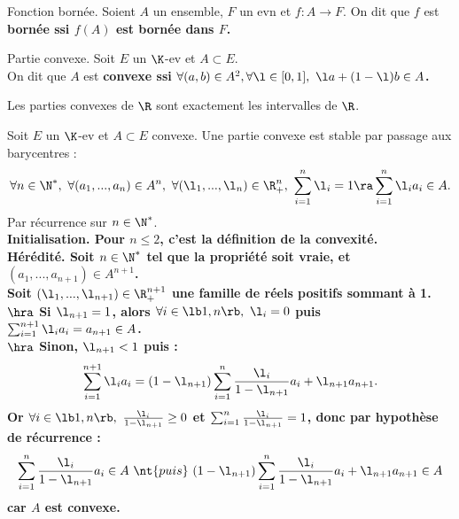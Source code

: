 \documentclass[11pt]{article}
\begin{document}
\vspace*{-0.8cm}

\begin{defi}{Fonction bornée.}{}
    Soient $A$ un ensemble, $F$ un evn et $f:A\to F$. On dit que $f$ est \bf{bornée} ssi $f(A)$ est bornée dans $F$.
\end{defi}

\vspace*{-0.8cm}

\begin{defi}{Partie convexe.}{}
    Soit $E$ un $\K$-ev et $A\subset E$.\\
    On dit que $A$ est \bf{convexe} ssi $\forall (a,b) \in A^2, \forall \l \in [0,1], ~ \l a + (1-\l)b \in A$.
\end{defi}

\vspace*{-0.8cm}

\begin{rappel}{}{}
    Les parties convexes de $\R$ sont exactement les intervalles de $\R$.
\end{rappel}

\vspace*{-0.4cm}

\begin{prop}{}{}
    Soit $E$ un $\K$-ev et $A\subset E$ convexe. Une partie convexe est stable par passage aux barycentres :
    \begin{equation*}
        \forall n \in \N^*, ~ \forall (a_1,...,a_n) \in A^n, ~ \forall (\l_1,...,\l_n) \in \R_+^n, ~ \sum_{i=1}^n \l_i = 1 \ra \sum_{i=1}^n\l_ia_i\in A.
    \end{equation*}
    \tcblower
    Par récurrence sur $n\in\N^*$.\\
    \bf{Initialisation.} Pour $n\leq2$, c'est la définition de la convexité.\\
    \bf{Hérédité.} Soit $n\in\N^*$ tel que la propriété soit vraie, et $(a_1,...,a_{n+1})\in A^{n+1}$.\\
    Soit $(\l_1,...,\l_{n+1})\in\R_{+}^{n+1}$ une famille de réels positifs sommant à 1.\\
    $\hra$ Si $\l_{n+1}=1$, alors $\forall i \in \lb1,n\rb, ~ \l_i = 0$ puis $\sum_{i=1}^{n+1}\l_ia_i=a_{n+1}\in A$.\\
    $\hra$ Sinon, $\l_{n+1}<1$ puis :
    \begin{equation*}
        \sum_{i=1}^{n+1}\l_ia_i = (1-\l_{n+1})\sum_{i=1}^n \frac{\l_i}{1-\l_{n+1}}a_i + \l_{n+1}a_{n+1}.
    \end{equation*}
    Or $\forall i \in \lb1,n\rb, ~ \frac{\l_i}{1-\l_{n+1}} \geq 0$ et $\sum_{i=1}^n\frac{\l_i}{1-\l_{n+1}}=1$, donc par hypothèse de récurrence :
    \begin{equation*}
        \sum_{i=1}^n \frac{\l_i}{1-\l_{n+1}} a_i \in A ~\nt{puis}~ (1-\l_{n+1})\sum_{i=1}^n\frac{\l_i}{1-\l_{n+1}}a_i+\l_{n+1}a_{n+1}\in A
    \end{equation*}
    car $A$ est convexe.
\end{prop}
\end{document}
